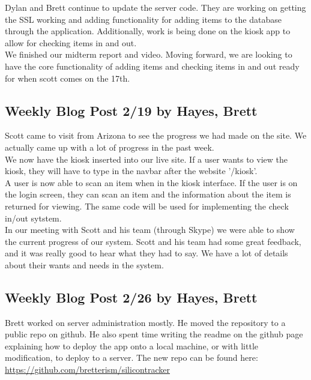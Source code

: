 \documentclass[10pt, onecolumn, twoside, peerreview]{IEEEtran}
\begin{document}
Dylan and Brett continue to update the server code. They are working on getting the SSL working and adding functionality for adding items to the database through the application. Additionally, work is being done on the kiosk app to allow for checking items in and out.\\

We finished our midterm report and video. Moving forward, we are looking to have the core functionality of adding items and checking items in and out ready for when scott comes on the 17th.

\subsection{Weekly Blog Post 2/19 by Hayes, Brett}
Scott came to visit from Arizona to see the progress we had made on the site. We actually came up with a lot of progress in the past week.\\

We now have the kiosk inserted into our live site. If a user wants to view the kiosk, they will have to type in the navbar after the website '/kiosk'.\\

A user is now able to scan an item when in the kiosk interface. If the user is on the login screen, they can scan an item and the information about the item is returned for viewing. The same code will be used for implementing the check in/out sytstem.\\

In our meeting with Scott and his team (through Skype) we were able to show the current progress of our system. Scott and his team had some great feedback, and it was really good to hear what they had to say. We have a lot of details about their wants and needs in the system.​

\subsection{Weekly Blog Post 2/26 by Hayes, Brett}
Brett worked on server administration mostly. He moved the repository to a public repo on github. He also spent time writing the readme on the github page explaining how to deploy the app onto a local machine, or with little modification, to deploy to a server. The new repo can be found here: \\

\url{https://github.com/bretterism/silicontracker​}\\
\end{document}
